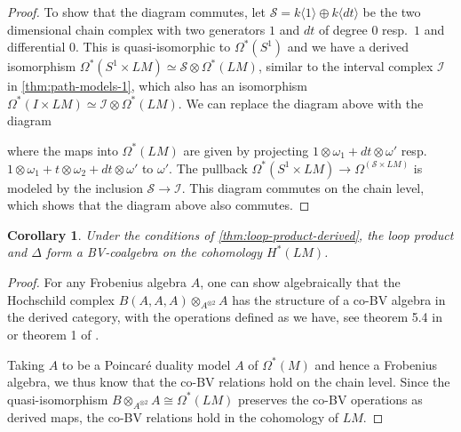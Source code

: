 \documentclass{scrartcl}
\theoremstyle{plain}
\newtheorem{corollary}[theorem]{Corollary}
\theoremstyle{definition}
\newcommand{\iso}{\cong}
\newcommand{\quiso}{\simeq}
\begin{document}
\begin{proof}
To show that the diagram commutes, let $\mathcal S = k\langle 1\rangle\oplus k\langle dt\rangle$ be the two dimensional chain complex  with two generators $1$ and $dt$ of degree $0$ resp.\ $1$ and differential $0$. This is quasi-isomorphic to $\Omega^*(S^1)$ and we have a derived isomorphism $\Omega^*(S^1\times LM)\quiso\mathcal S\otimes \Omega^*(LM)$, similar to the interval complex $\mathcal I$ in \cref{thm:path-models-1}, which also has an isomorphism $\Omega^*(I\times LM)\quiso \mathcal I\otimes\Omega^*(LM)$. We can replace the diagram above with the diagram
\begin{center}
\end{center}

where the maps into $\Omega^*(LM)$ are given by projecting $1\otimes \omega_1+dt\otimes\omega'$ resp.\ $1\otimes\omega_1+t\otimes \omega_2+dt\otimes \omega'$ to $\omega'$. The pullback $\Omega^*(S^1\times LM)\to \Omega^(\mathcal S\times LM)$ is modeled by the inclusion $\mathcal S\to\mathcal I$. This diagram commutes on the chain level, which shows that the diagram above also commutes. 
\end{proof}

\begin{corollary}
    Under the conditions of \cref{thm:loop-product-derived}, the loop product and $\Delta$ form a BV-coalgebra on the cohomology $H^*(LM)$.
\end{corollary}
\begin{proof}
    For any Frobenius algebra $A$, one can show algebraically that the Hochschild complex $B(A, A, A)\otimes_{A^{\otimes 2}} A$ has the structure of a co-BV algebra in the derived category, with the operations defined as we have, see theorem 5.4 in \cite{abbaspour2015algebraic} or theorem 1 of \cite{tradler2008bvalg}.

    Taking $A$ to be a Poincaré duality model $A$ of $\Omega^*(M)$ and hence a Frobenius algebra, we thus know that the co-BV relations hold on the chain level. Since the quasi-isomorphism $B\otimes_{A^{\otimes 2}}A\iso \Omega^*(LM)$ preserves the co-BV operations as derived maps, the co-BV relations hold in the cohomology of $LM$. 
\end{proof}
\end{document}
